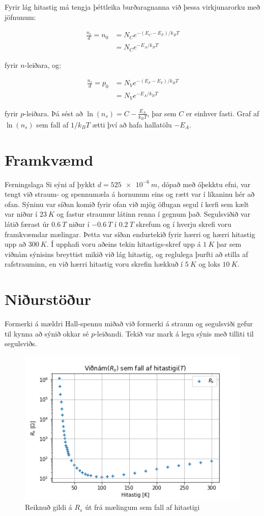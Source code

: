 \documentclass[11pt]{article}
\begin{document}
Fyrir lág hitastig má tengja þéttleika burðaragnanna við þessa virkjunarorku með jöfnunum:

\begin{align}
\frac{n_s}{d} = n_0 &= N_C e^{-(E_C-E_F)/k_BT}\nonumber\\
    & = N_C e^{-E_A/k_BT}
\end{align}

fyrir $n$-leiðara, og:

\begin{align}
\frac{n_s}{d} = p_0 &= N_V e^{-(E_F-E_V)/k_BT}\nonumber\\
    & = N_V e^{-E_A/k_BT}
\end{align}

fyrir $p$-leiðara. Þá sést að $\ln(n_s) = C - \frac{E_A}{k_B T}$, þar sem $C$ er einhver fasti. Graf af $\ln(n_s)$ sem fall af $1/k_BT$ ætti því að hafa hallatölu $-E_A$.

\newpage

\section{Framkvæmd}
Ferningslaga Si sýni af þykkt $d = \SI{525e-6}{m}$, dópað með óþekktu efni, var tengt við straum- og spennumæla á hornunum eins og rætt var í líkaninu hér að ofan. Sýninu var síðan komið fyrir ofan við mjög öflugan segul í kerfi sem kælt var niður í $\SI{23}{K}$ og fastur straumur látinn renna í gegnum það. Segulsviðið var látið færast úr $\SI{0.6}{T}$ niður í $\SI{-0.6}{T}$ í $\SI{0.2}{T}$ skrefum og í hverju skrefi voru framkvæmdar mælingar. Þetta var síðan endurtekið fyrir hærri og hærri hitastig upp að $\SI{300}{K}$. Í upphafi voru aðeins tekin hitastigs-skref upp á $\SI{1}{K}$ þar sem viðnám sýnisins breyttist mikið við lág hitastig, og reglulega þurfti að stilla af rafstrauminn, en við hærri hitastig voru skrefin hækkuð í $\SI{5}{K}$ og loks $\SI{10}{K}$.

\section{Niðurstöður}
Formerki á mældri Hall-spennu miðað við formerki á straum og segulsviði gefur til kynna að sýnið okkar sé $p$-leiðandi. Tekið var mark á legu sýnis með tilliti til segulsviðs.
\begin{figure}[H]
    \centering
    \includegraphics{R_s.PNG}
    \caption{Reiknuð gildi á $R_s$ út frá mælingum sem fall af hitastigi}
    \label{fig:R_s}
\end{figure}
\end{document}
